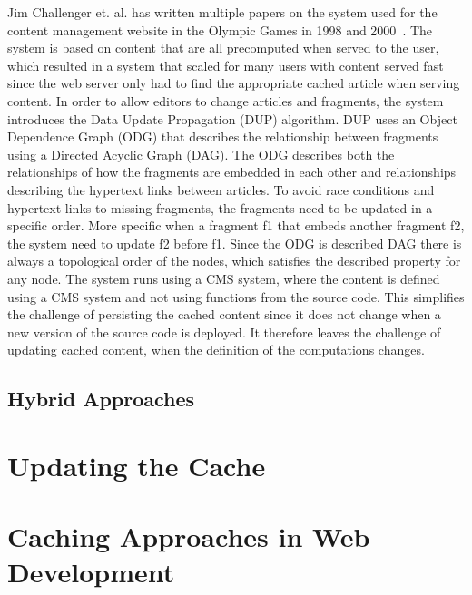 Jim Challenger et. al. has written multiple papers on the system used for the content management website in the Olympic Games in 1998 and 2000~\cite{paper:ibm, paper:ibm-extended}. The system is based on content that are all precomputed when served to the user, which resulted in a system that scaled for many users with content served fast since the web server only had to find the appropriate cached article when serving content. In order to allow editors to change articles and fragments, the system introduces the Data Update Propagation (DUP) algorithm. DUP uses an Object Dependence Graph (ODG) that describes the relationship between fragments using a Directed Acyclic Graph (DAG). The ODG describes both the relationships of how the fragments are embedded in each other and relationships describing the hypertext links between articles. To avoid race conditions and hypertext links to missing fragments, the fragments need to be updated in a specific order. More specific when a fragment f1 that embeds another fragment f2, the system need to update f2 before f1. Since the ODG is described DAG there is always a topological order of the nodes, which satisfies the described property for any node. The system runs using a CMS system, where the content is defined using a CMS system and not using functions from the source code. This simplifies the challenge of persisting the cached content since it does not change when a new version of the source code is deployed. It therefore leaves the challenge of updating cached content, when the definition of the computations changes.



\subsection{Hybrid Approaches}
\label{subsec:hybrid_approaches}



\section{Updating the Cache}
\label{sec:updating_the_cache}


\section{Caching Approaches in Web Development}
\label{sec:caching_approaches_in_web_development}

